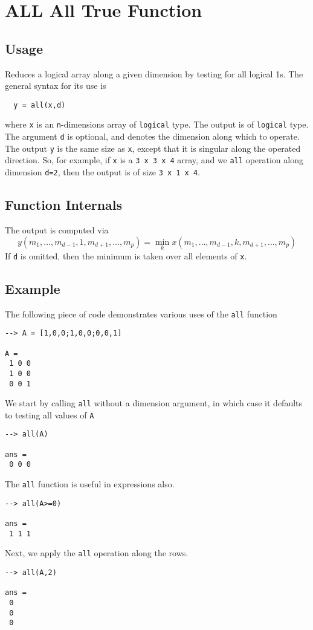 \section{ALL All True Function}

\subsection{Usage}

Reduces a logical array along a given dimension by testing for all
logical 1s.  The general 
syntax for its use is
\begin{verbatim}
  y = all(x,d)
\end{verbatim}
where \verb|x| is an \verb|n|-dimensions array of \verb|logical| type.
The output is of \verb|logical| type.  The argument \verb|d| is 
optional, and denotes the dimension along which to operate.
The output \verb|y| is the same size as \verb|x|, except that it is 
singular along the operated direction.  So, for example,
if \verb|x| is a \verb|3 x 3 x 4| array, and we \verb|all| operation along
dimension \verb|d=2|, then the output is of size \verb|3 x 1 x 4|.
\subsection{Function Internals}

The output is computed via
\[
y(m_1,\ldots,m_{d-1},1,m_{d+1},\ldots,m_{p}) = 
\min_{k} x(m_1,\ldots,m_{d-1},k,m_{d+1},\ldots,m_{p})
\]
If \verb|d| is omitted, then the minimum is taken over all elements of
\verb|x|.
\subsection{Example}

The following piece of code demonstrates various uses of the \verb|all|
function
\begin{verbatim}
--> A = [1,0,0;1,0,0;0,0,1]

A = 
 1 0 0 
 1 0 0 
 0 0 1 
\end{verbatim}
We start by calling \verb|all| without a dimension argument, in which 
case it defaults to testing all values of \verb|A|
\begin{verbatim}
--> all(A)

ans = 
 0 0 0 
\end{verbatim}
The \verb|all| function is useful in expressions also.
\begin{verbatim}
--> all(A>=0)

ans = 
 1 1 1 
\end{verbatim}
Next, we apply the \verb|all| operation along the rows.
\begin{verbatim}
--> all(A,2)

ans = 
 0 
 0 
 0 
\end{verbatim}
